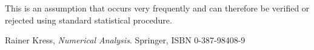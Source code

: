 \documentclass[a4paper]{article}
\begin{document}
This is an assumption that occurs very frequently and can therefore be verified or rejected using standard statistical procedure.


\begin{thebibliography}{9}
  Rainer Kress,
  \emph{Numerical Analysis}.
  Springer, ISBN 0-387-98408-9
\end{thebibliography}
\end{document}
